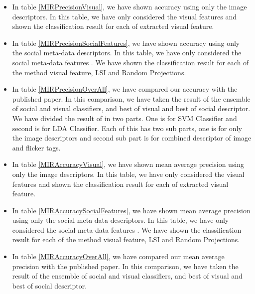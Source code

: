 \begin{itemize}
\item In table \ref{MIRPrecisionVisual}, we have shown accuracy using only the image descriptors. In this table, we have only considered the visual features and shown the classification result for each of extracted visual feature.
\item In table \ref{MIRPrecisionSocialFeatures}, we have shown accuracy using only the social meta-data descriptors. In this table, we have only considered the social meta-data features . We have shown the classification result for each of the method visual feature, LSI and Random Projections.
\item In table \ref{MIRPrecisionOverAll}, we have compared our accuracy with the published paper. In this comparison, we have taken the result of the ensemble of social and visual classifiers, and best of visual and best of social descriptor. We have divided the result of \citep{MIRresults} in two parts. One is for SVM Classifier and second is for LDA Classifier. Each of this has two sub parts, one is for only the image descriptors and second sub part is for combined descriptor of image and flicker tags.

\item In table \ref{MIRAccuracyVisual}, we have shown mean average precision using only the image descriptors. In this table, we have only considered the visual features and shown the classification result for each of extracted visual feature.
\item In table \ref{MIRAccuracySocialFeatures}, we have shown mean average precision using only the social meta-data descriptors. In this table, we have only considered the social meta-data features . We have shown the classification result for each of the method visual feature, LSI and Random Projections.
\item In table \ref{MIRAccuracyOverAll}, we have compared our mean average precision with the published paper. In this comparison, we have taken the result of the ensemble of social and visual classifiers, and best of visual and best of social descriptor. 
\end{itemize}

